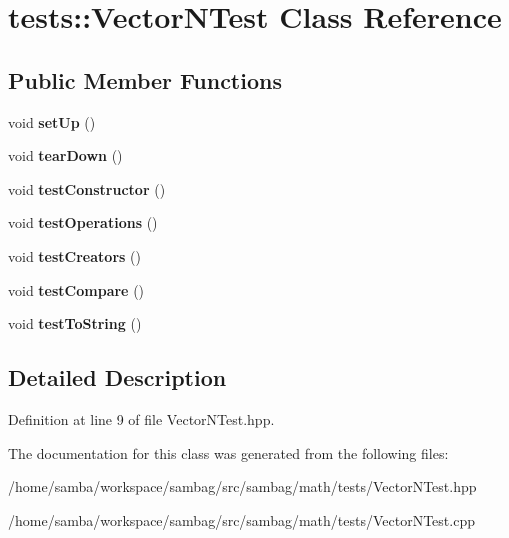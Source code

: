 \hypertarget{classtests_1_1_vector_n_test}{
\section{tests::VectorNTest Class Reference}
\label{classtests_1_1_vector_n_test}
}
\subsection*{Public Member Functions}
\begin{DoxyCompactItemize}
\item 
\hypertarget{classtests_1_1_vector_n_test_a6d87bb8a36581dd71dcad6e0c2639b29}{
void {\bfseries setUp} ()}
\label{classtests_1_1_vector_n_test_a6d87bb8a36581dd71dcad6e0c2639b29}

\item 
\hypertarget{classtests_1_1_vector_n_test_adbe70c71fcdb9145888e51ee1b36f08e}{
void {\bfseries tearDown} ()}
\label{classtests_1_1_vector_n_test_adbe70c71fcdb9145888e51ee1b36f08e}

\item 
\hypertarget{classtests_1_1_vector_n_test_a11ba6a650e87cf7bd49a1c1244bc23e7}{
void {\bfseries testConstructor} ()}
\label{classtests_1_1_vector_n_test_a11ba6a650e87cf7bd49a1c1244bc23e7}

\item 
\hypertarget{classtests_1_1_vector_n_test_a8e76f08d9d07979e1e46df637bcf0dd4}{
void {\bfseries testOperations} ()}
\label{classtests_1_1_vector_n_test_a8e76f08d9d07979e1e46df637bcf0dd4}

\item 
\hypertarget{classtests_1_1_vector_n_test_a7cda2c6814d2afc3b2fd5c77ca4459a6}{
void {\bfseries testCreators} ()}
\label{classtests_1_1_vector_n_test_a7cda2c6814d2afc3b2fd5c77ca4459a6}

\item 
\hypertarget{classtests_1_1_vector_n_test_ae29dec57e9ebb03cabd80a41ceccb6fb}{
void {\bfseries testCompare} ()}
\label{classtests_1_1_vector_n_test_ae29dec57e9ebb03cabd80a41ceccb6fb}

\item 
\hypertarget{classtests_1_1_vector_n_test_a1ce59a9193a7991de0434f1ba554dc55}{
void {\bfseries testToString} ()}
\label{classtests_1_1_vector_n_test_a1ce59a9193a7991de0434f1ba554dc55}

\end{DoxyCompactItemize}


\subsection{Detailed Description}


Definition at line 9 of file VectorNTest.hpp.



The documentation for this class was generated from the following files:\begin{DoxyCompactItemize}
\item 
/home/samba/workspace/sambag/src/sambag/math/tests/VectorNTest.hpp\item 
/home/samba/workspace/sambag/src/sambag/math/tests/VectorNTest.cpp\end{DoxyCompactItemize}
